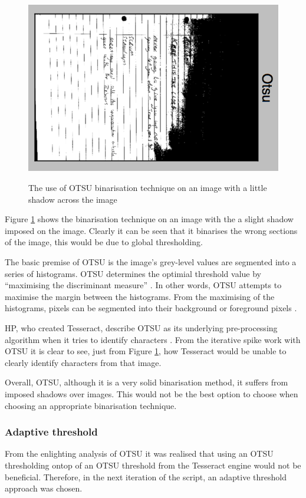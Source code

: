 \begin{figure}[H]
  \centering
  \includegraphics{images/OTSU}
  \label{fig:OTSU}
  \caption{The use of OTSU binarisation technique on an image with a little shadow across the image}
\end{figure}

Figure \ref{fig:OTSU} shows the binarisation technique on an image with the a slight shadow imposed on the image. Clearly it can be seen that it binarises the wrong sections of the image, this would be due to global thresholding.

The basic premise of OTSU is the image's grey-level values are segmented into a series of histograms. OTSU determines the optimial threshold value by ``maximising the discriminant measure'' \cite{citeulike:2917492}. In other words, OTSU attempts to maximise the margin between the histograms. From the maximising of the histograms, pixels can be segmented into their background or foreground pixels \cite{citeulike:14021372}.

HP, who created Tesseract, describe OTSU as its underlying pre-processing algorithm when it tries to identify characters \cite{citeulike:13931186}. From the iterative spike work with OTSU it is clear to see, just from Figure \ref{fig:OTSU}, how Tesseract would be unable to clearly identify characters from that image.

Overall, OTSU, although it is a very solid binarisation method, it suffers from imposed shadows over images. This would not be the best option to choose when choosing an appropriate binarisation technique.

\subsubsection{Adaptive threshold} \label{section:threshold}
From the enlighting analysis of OTSU it was realised that using an OTSU thresholding ontop of an OTSU threshold from the Tesseract engine would not be beneficial. Therefore, in the next iteration of the script, an adaptive threshold approach was chosen.

